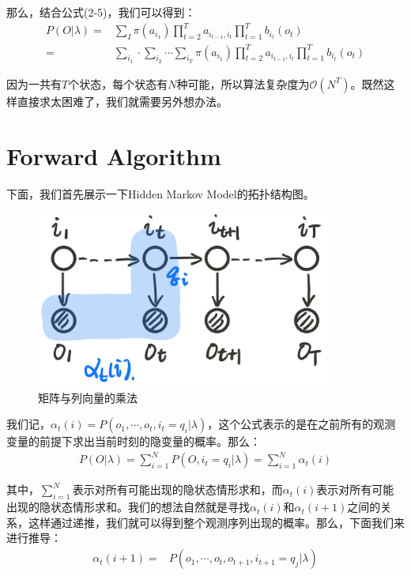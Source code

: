 \documentclass[a4paper]{article}
\begin{document}
那么，结合公式(2-5)，我们可以得到：
\begin{equation}
\begin{split}
        P(O|\lambda) = & \sum_I  \pi(a_{i_1}) \prod_{t=2}^T a_{i_{t-1},i_t} \prod_{t=1}^T b_{i_t}(o_t) \\
        = & \sum_{i_1}\cdot \sum_{i_2} \cdots \sum_{i_T} \pi(a_{i_1}) \prod_{t=2}^T a_{i_{t-1},i_t} \prod_{t=1}^T b_{i_t}(o_t)
\end{split}
\end{equation}

因为一共有$T$个状态，每个状态有$N$种可能，所以算法复杂度为$\mathcal{O}(N^T)$。既然这样直接求太困难了，我们就需要另外想办法。

\section{Forward Algorithm}
下面，我们首先展示一下Hidden Markov Model的拓扑结构图。
\begin{figure}[H]
    \centering
    \includegraphics[width=.5\textwidth]{微信图片_20200108102954.png}
    \caption{矩阵与列向量的乘法}
    \label{fig:my_label_1}
\end{figure}

我们记，$\alpha_t(i) = P(o_1,\cdots,o_t,i_t = q_i|\lambda) $，这个公式表示的是在之前所有的观测变量的前提下求出当前时刻的隐变量的概率。那么：
\begin{equation}
    \begin{split}
        P(O|\lambda) = \sum_{i=1}^N P(O, i_t = q_i | \lambda) = \sum_{i=1}^N \alpha_t(i)
    \end{split}
\end{equation}

其中，$\sum_{i=1}^N$表示对所有可能出现的隐状态情形求和，而$\alpha_t(i)$表示对所有可能出现的隐状态情形求和。我们的想法自然就是寻找$\alpha_t(i)$和$\alpha_t(i+1)$之间的关系，这样通过递推，我们就可以得到整个观测序列出现的概率。那么，下面我们来进行推导：
\begin{equation}
    \begin{split}
        \alpha_t(i+1) = & P(o_1,\cdots,o_t,o_{t+1},i_{t+1}=q_j|\lambda) \\
    \end{split}
\end{equation}
\end{document}
